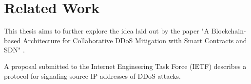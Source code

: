 \chapter{Related Work}

This thesis aims to further explore the idea laid out by the paper "A Blockchain-based Architecture for Collaborative DDoS Mitigation with Smart Contracts and SDN" \cite{OriginalPaper}.

A proposal submitted to the Internet Engineering Task Force (IETF) \cite{IETFDraft} describes a protocol for signaling source IP addresses of DDoS attacks. 
